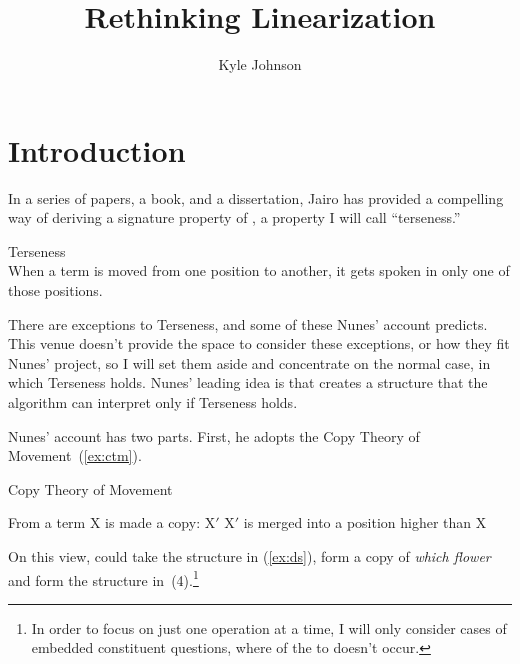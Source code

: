 \documentclass[output=paper]{langsci/langscibook}
\author{Kyle Johnson\affiliation{University of Massachusetts, Amherst}}
\title{Rethinking Linearization}
\begin{document}
\glsresetall

\section{Introduction}

In a series of papers, a book, and a dissertation, Jairo \citeauthor{Nunes1995}
has provided a compelling way of deriving a signature property of , a
property I will call ``terseness.'' \nocite{Nunes1995, Nunes1996, Nunes1999}
\nocite{Nunes2004}

\begin{exe}
	\ex \label{ex:terseness} Terseness\\
    When a term is moved from one position to another, it gets spoken in only
    one of those positions.
\end{exe}

There are exceptions to Terseness, and some of these Nunes' account predicts.
This venue doesn't provide the space to consider these exceptions, or how they
fit Nunes' project, so I will set them aside and concentrate on the normal
case, in which Terseness holds. Nunes' leading idea is that  creates a
structure that the  algorithm can interpret only if Terseness
holds.

Nunes' account has two parts. First, he adopts the Copy Theory of
Movement~(\ref{ex:ctm}).
\begin{exe}
	\ex \label{ex:ctm} Copy Theory of Movement
	\begin{xlist}
		\ex From a term X is made a copy: X$'$
		\ex X$'$ is merged into a position higher than X
	\end{xlist}
\end{exe}

On this view,  could take the structure in (\ref{ex:ds}), form a
copy of \emph{which flower} and form the structure
in~(4).\footnote{In order to focus on just one  operation at a time, I
    will only consider cases of embedded constituent questions, where 
of the  to  doesn't occur.} %
\end{document}
